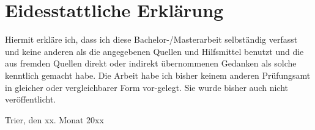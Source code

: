 \thispagestyle{empty}
\par
\chapter*{Eidesstattliche Erklärung}

Hiermit erkläre ich, dass ich diese Bachelor-/Masterarbeit selbständig verfasst und keine anderen als die angegebenen Quellen und Hilfsmittel benutzt und die aus fremden Quellen direkt oder indirekt übernommenen Gedanken als solche kenntlich gemacht habe. Die Arbeit habe ich bisher keinem anderen Prüfungsamt in gleicher oder vergleichbarer Form vor-gelegt. Sie wurde bisher auch nicht veröffentlicht.

Trier, den xx. Monat 20xx

\clearpage






